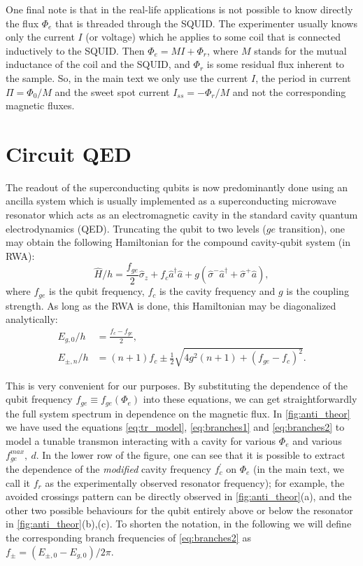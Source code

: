 \documentclass[%
 aip,
 draft,
 amsmath,amssymb,
 reprint,%
]{revtex4-1}
\begin{document}
One final note is that in the real-life applications is not possible to know directly the flux $\Phi_e$ that is threaded through the SQUID. The experimenter usually knows only the current $I$ (or voltage) which he applies to some coil that is connected inductively to the SQUID. Then $\Phi_e = M I + \Phi_r$, where $M$ stands for the mutual inductance of the coil and the SQUID, and $\Phi_r$ is some residual flux inherent to the sample. So, in the main text we only use the current $I$, the period in current $\Pi = \Phi_0/M$ and the sweet spot current $I_{ss} = -\Phi_r/M$ and not the corresponding magnetic fluxes.

\section{Circuit QED}\label{sec:cqed}

The readout of the superconducting qubits is now predominantly done using an ancilla system which is usually implemented as a superconducting microwave resonator which acts as an electromagnetic cavity in the standard cavity quantum electrodynamics (QED). Truncating the qubit to two levels ($ge$ transition), one may obtain the following Hamiltonian for the compound cavity-qubit system (in RWA):
\begin{equation}
\hat H/h = \frac{f_{ge}}{2} \hat \sigma_z + f_c \hat a^\dagger \hat a + g(\hat \sigma^- \hat a^\dagger + \hat \sigma^+ \hat a),
\end{equation}
where $f_{ge}$ is the qubit frequency, $f_c$ is the cavity frequency and $g$ is the coupling strength. As long as the RWA is done, this Hamiltonian may be diagonalized analytically\cite{blais2004}:
\begin{align}
E_{g, 0}/h &= \frac{f_c - f_{ge}}{2},\label{eq:branches1}
\\
E_{\pm, n}/h &= (n+1)f_c \pm \frac{1}{2}\sqrt{4g^2(n+1)+(f_{ge}-f_c)^2}.
\label{eq:branches2}
\end{align}

This is very convenient for our purposes. By substituting the dependence of the qubit frequency $f_{ge} \equiv f_{ge}(\Phi_e)$ into these equations, we can get straightforwardly the full system spectrum in dependence on the magnetic flux. In \autoref{fig:anti_theor} we have used the equations \eqref{eq:tr_model}, \eqref{eq:branches1} and \eqref{eq:branches2} to model a tunable transmon interacting with a cavity for various $\Phi_e$ and various $f_{ge}^{max},\ d$. In the lower row of the figure, one can see that it is possible to extract the dependence of the \textit{modified} cavity frequency $f_c^\prime$ on $\Phi_e$ (in the main text, we call it $f_r$ as the experimentally observed resonator frequency); for example, the avoided crossings pattern can be directly observed in \autoref{fig:anti_theor}(a), and the other two possible behaviours for the qubit entirely above or below the resonator in \autoref{fig:anti_theor}(b),(c). To shorten the notation, in the following we will define the corresponding branch frequencies of \eqref{eq:branches2} as $f_{\pm} = ( E_{\pm,0}-E_{g,0})/2\pi$.
\end{document}
